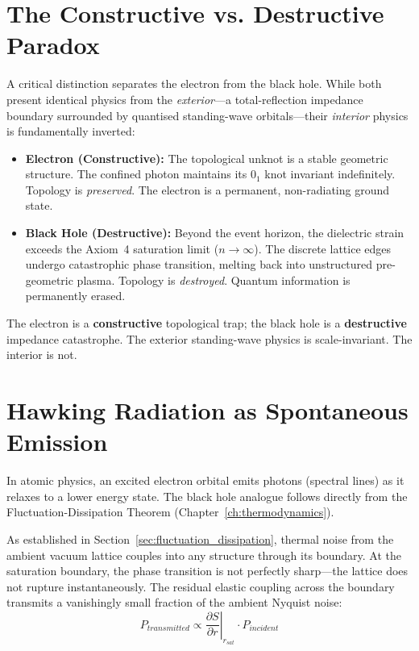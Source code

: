 \section{The Constructive vs. Destructive Paradox}

A critical distinction separates the electron from the black hole. While both present identical physics from the \textit{exterior}---a total-reflection impedance boundary surrounded by quantised standing-wave orbitals---their \textit{interior} physics is fundamentally inverted:

\begin{itemize}
    \item \textbf{Electron (Constructive):} The topological unknot is a stable geometric structure. The confined photon maintains its $0_1$ knot invariant indefinitely. Topology is \textit{preserved}. The electron is a permanent, non-radiating ground state.
    \item \textbf{Black Hole (Destructive):} Beyond the event horizon, the dielectric strain exceeds the Axiom~4 saturation limit ($n \to \infty$). The discrete lattice edges undergo catastrophic phase transition, melting back into unstructured pre-geometric plasma. Topology is \textit{destroyed}. Quantum information is permanently erased.
\end{itemize}

The electron is a \textbf{constructive} topological trap; the black hole is a \textbf{destructive} impedance catastrophe. The exterior standing-wave physics is scale-invariant. The interior is not.

\section{Hawking Radiation as Spontaneous Emission}
\label{sec:hawking_emission}

In atomic physics, an excited electron orbital emits photons (spectral lines) as it relaxes to a lower energy state. The black hole analogue follows directly from the Fluctuation-Dissipation Theorem (Chapter~\ref{ch:thermodynamics}).

As established in Section~\ref{sec:fluctuation_dissipation}, thermal noise from the ambient vacuum lattice couples into any structure through its boundary. At the saturation boundary, the phase transition is not perfectly sharp---the lattice does not rupture instantaneously. The residual elastic coupling across the boundary transmits a vanishingly small fraction of the ambient Nyquist noise:
\begin{equation}
    P_{transmitted} \propto \left.\frac{\partial S}{\partial r}\right|_{r_{sat}} \cdot P_{incident}
\end{equation}

